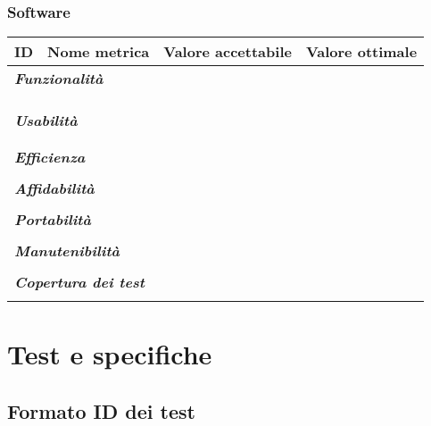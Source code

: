\documentclass[10pt, a4paper]{article}
\begin{document}
\subsubsection{Software}
    {\renewcommand{\arraystretch}{1.5}
    \begin{tabularx}{\textwidth}{p{}|p{}|X|X}
    \textbf{ID} & \textbf{Nome metrica} & \textbf{Valore accettabile} & \textbf{Valore ottimale}  \\
    \hline
    \multicolumn{4}{l}{\cellcolor{primarycolor}\textbf{\textit{Funzionalità}}} \\
    \hline
     &  &  &  \\
    \hline
     &  &  &  \\
    \hline
     &  &  &  \\
    \hline
    \multicolumn{4}{l}{\cellcolor{primarycolor}\textbf{\textit{Usabilità}}} \\
    \hline
     &  &  &  \\
    \hline
     &  &  &  \\
    \multicolumn{4}{l}{\cellcolor{primarycolor}\textbf{\textit{Efficienza}}} \\
    \hline
     &  &  &  \\
    \hline
    \multicolumn{4}{l}{\cellcolor{primarycolor}\textbf{\textit{Affidabilità}}} \\
    \hline
     &  &  &  \\
    \hline
    \multicolumn{4}{l}{\cellcolor{primarycolor}\textbf{\textit{Portabilità}}} \\
    \hline
     &  &  &  \\
    \hline
    \multicolumn{4}{l}{\cellcolor{primarycolor}\textbf{\textit{Manutenibilità}}} \\
    \hline
     &  &  &  \\
    \hline
    \multicolumn{4}{l}{\cellcolor{primarycolor}\textbf{\textit{Copertura dei test}}} \\
    \hline
     &  &  &  \\
    \end{tabularx}}

\newpage
\section{Test e specifiche}

\subsection{Formato ID dei test}
\end{document}
